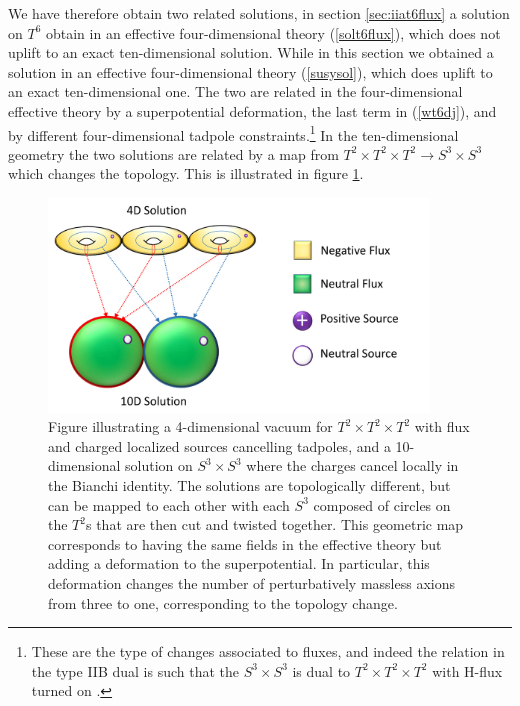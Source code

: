 \documentclass[11pt,a4paper]{article}
\numberwithin{equation}{section}
\numberwithin{table}{section}\setlength{\multlinegap}{25pt}
\begin{document}
We have therefore obtain two related solutions, in section \ref{sec:iiat6flux} a solution on $T^6$ obtain in an effective four-dimensional theory (\ref{solt6flux}), which does not uplift to an exact ten-dimensional solution. While in this section we obtained a solution in an effective four-dimensional theory (\ref{susysol}), which does uplift to an exact ten-dimensional one. The two are related in the four-dimensional effective theory by a superpotential deformation, the last term in (\ref{wt6dj}), and by different four-dimensional tadpole constraints.\footnote{These are the type of changes associated to fluxes, and indeed the relation in the type IIB dual is such that the $S^3\times S^3$ is dual to $T^2 \times T^2 \times T^2$ with H-flux turned on \cite{Kachru:2002sk,Camara:2005dc}.} In the ten-dimensional geometry the two solutions are related by a map from $T^2 \times T^2 \times T^2 \rightarrow S^3 \times S^3$ which changes the topology. This is illustrated in figure \ref{fig:tt6s3}. 
\begin{figure}[t]
\centering
 \includegraphics[width=0.9\textwidth]{tt6back.pdf}
\caption{Figure illustrating a 4-dimensional vacuum for $T^2 \times T^2 \times T^2$ with flux and charged localized sources cancelling tadpoles, and a 10-dimensional solution on $S^3 \times S^3$ where the charges cancel locally in the Bianchi identity. The solutions are topologically different, but can be mapped to each other with each $S^3$ composed of circles on the $T^2$s that are then cut and twisted together. This geometric map corresponds to having the same fields in the effective theory but adding a deformation to the superpotential. In particular, this deformation changes the number of perturbatively massless axions from three to one, corresponding to the topology change.}
\label{fig:tt6s3}
\end{figure}
\end{document}
